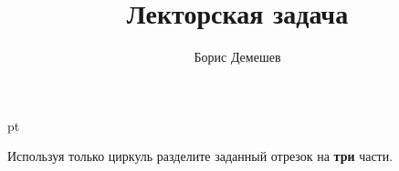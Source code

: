 \documentclass[pdftex,12pt,a4paper]{article}
\title{Лекторская задача}
\author{Борис Демешев}
\date{}
\begin{document}
 pt %
\maketitle

\begin{center}
Используя только циркуль разделите заданный отрезок на \textbf{три} части.
\end{center}
\end{document}
